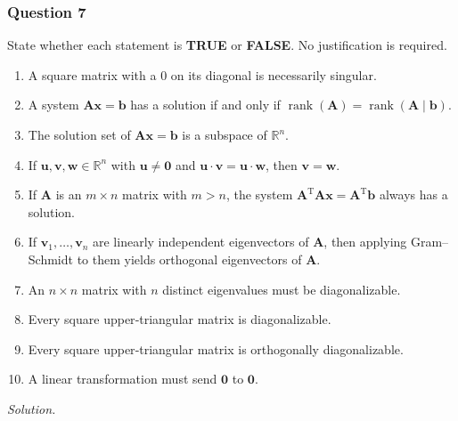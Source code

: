 \documentclass[12pt]{article}
\begin{document}
\subsubsection*{Question 7}
State whether each statement is \textbf{TRUE} or \textbf{FALSE}.
No justification is required.
\begin{enumerate}[label=\textbf{(\alph*)}]
\itemsep 0em
  \item A square matrix with a $0$ on its diagonal is necessarily singular.
  \item A system $\mathbf{Ax}=\mathbf{b}$ has a solution if and only if  $\operatorname{rank}\left(\mathbf{A}\right)=\operatorname{rank}\left(\mathbf{A}\mid \mathbf{b}\right)$.
  \item The solution set of $\mathbf{Ax}=\mathbf{b}$ is a subspace of $\mathbb R^n$.
  \item If $\mathbf{u},\mathbf{v},\mathbf{w}\in\mathbb R^n$ with $\mathbf{u}\ne \mathbf{0}$ and $\mathbf{u}\cdot \mathbf{v}=\mathbf{u}\cdot \mathbf{w}$, then $\mathbf{v}=\mathbf{w}$.
  \item If $\mathbf{A}$ is an $m\times n$ matrix with $m>n$, the system $\mathbf{A}^\text{T}\mathbf{Ax}=\mathbf{A}^\text{T}\mathbf{b}$ always has a solution.
  \item If $\mathbf{v}_1,\ldots,\mathbf{v}_n$ are linearly independent eigenvectors of $\mathbf{A}$, then applying Gram–Schmidt to them yields orthogonal eigenvectors of $\mathbf{A}$.
  \item An $n\times n$ matrix with $n$ distinct eigenvalues must be diagonalizable.
  \item Every square upper‐triangular matrix is diagonalizable.
  \item Every square upper‐triangular matrix is orthogonally diagonalizable.
  \item A linear transformation must send $\mathbf{0}$ to $\mathbf{0}$.
\end{enumerate}
\noindent\emph{Solution.}
\end{document}
